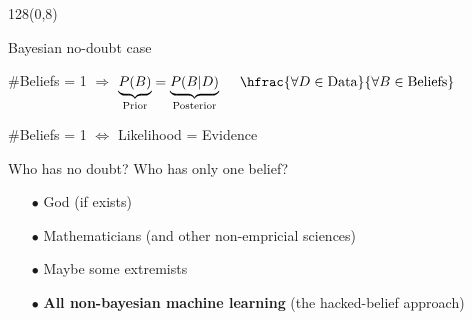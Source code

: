 \documentclass[shownotes]{beamer}
\begin{document}
\begin{frame}
 \begin{textblock}{128}(0,8)
\begin{center}
 \Large Bayesian no-doubt case
\end{center}
\end{textblock}
\vspace{0.5cm}


 \begin{mdframed}[backgroundcolor=black!15]
 \centering
 $\#$Beliefs = 1 $\Longrightarrow$ $\underbrace{P(B)}_{\text{\scriptsize Prior}} = \underbrace{P(B|D)}_{\text{\scriptsize Posterior}} \ \ \ \ \hfrac{\forall D \in \text{Data}}{\forall B \in \text{Beliefs}}$
\end{mdframed}

 \vspace{0.9cm}
\pause 


\begin{mdframed}[backgroundcolor=black!15]
\centering
 $\#$Beliefs = 1  $\Longleftrightarrow$ Likelihood = Evidence  
\end{mdframed}
 

 

\end{frame}

\begin{frame}
 \vspace{0.5cm}


\begin{center}
 \centering \large
  Who has no doubt? Who has only one belief?
\end{center}
 
 \vspace{0.3cm}
 \pause
 
 \begin{itemize}
  \item[$\bullet$] God (if exists) \pause
  \item[$\bullet$] Mathematicians (and other non-empricial sciences) \pause
  \item[$\bullet$] Maybe some extremists \pause
  \item[$\bullet$] \textbf{All non-bayesian machine learning} \pause (the hacked-belief approach)
 \end{itemize}

 
\end{frame}
\end{document}
